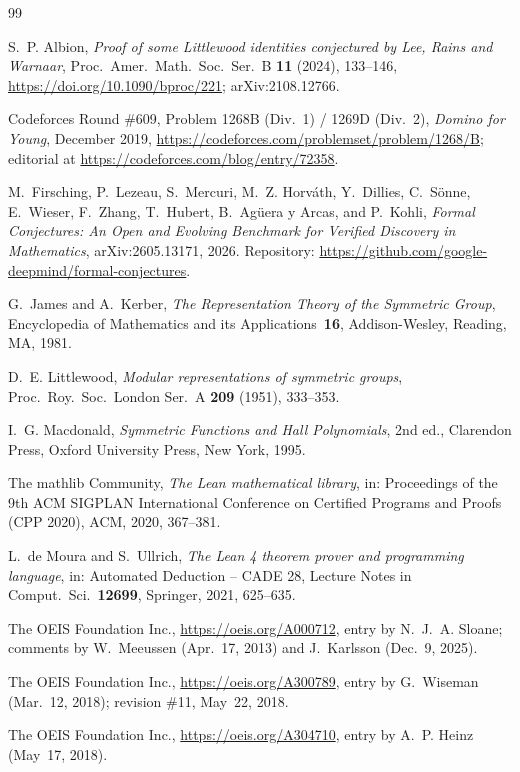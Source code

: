 \documentclass[11pt]{amsart}
\theoremstyle{plain}
\theoremstyle{definition}
\begin{document}
{\small
\begin{thebibliography}{99}

S.~P. Albion, \emph{Proof of some Littlewood identities conjectured by Lee, Rains and Warnaar}, Proc.\ Amer.\ Math.\ Soc.\ Ser.~B \textbf{11} (2024), 133--146, \url{https://doi.org/10.1090/bproc/221}; arXiv:2108.12766.

Codeforces Round \#609, Problem 1268B (Div.~1) / 1269D (Div.~2), \emph{Domino for Young}, December 2019, \url{https://codeforces.com/problemset/problem/1268/B}; editorial at \url{https://codeforces.com/blog/entry/72358}.

M.~Firsching, P.~Lezeau, S.~Mercuri, M.~Z. Horv\'ath, Y.~Dillies, C.~S\"onne, E.~Wieser, F.~Zhang, T.~Hubert, B.~Ag\"uera y Arcas, and P.~Kohli, \emph{Formal Conjectures: An Open and Evolving Benchmark for Verified Discovery in Mathematics}, arXiv:2605.13171, 2026. Repository: \url{https://github.com/google-deepmind/formal-conjectures}.

G.~James and A.~Kerber, \emph{The Representation Theory of the Symmetric Group}, Encyclopedia of Mathematics and its Applications~\textbf{16}, Addison-Wesley, Reading, MA, 1981.

D.~E. Littlewood, \emph{Modular representations of symmetric groups}, Proc.\ Roy.\ Soc.\ London Ser.~A \textbf{209} (1951), 333--353.

I.~G. Macdonald, \emph{Symmetric Functions and Hall Polynomials}, 2nd ed., Clarendon Press, Oxford University Press, New York, 1995.

The mathlib Community, \emph{The Lean mathematical library}, in: Proceedings of the 9th ACM SIGPLAN International Conference on Certified Programs and Proofs (CPP 2020), ACM, 2020, 367--381.

L.~de Moura and S.~Ullrich, \emph{The Lean 4 theorem prover and programming language}, in: Automated Deduction -- CADE 28, Lecture Notes in Comput.\ Sci.\ \textbf{12699}, Springer, 2021, 625--635.

The OEIS Foundation Inc., \url{https://oeis.org/A000712}, entry by N.~J.~A. Sloane; comments by W.~Meeussen (Apr.~17, 2013) and J.~Karlsson (Dec.~9, 2025).

The OEIS Foundation Inc., \url{https://oeis.org/A300789}, entry by G.~Wiseman (Mar.~12, 2018); revision \#11, May~22, 2018.

The OEIS Foundation Inc., \url{https://oeis.org/A304710}, entry by A.~P. Heinz (May~17, 2018).

\end{thebibliography}
}
\end{document}

